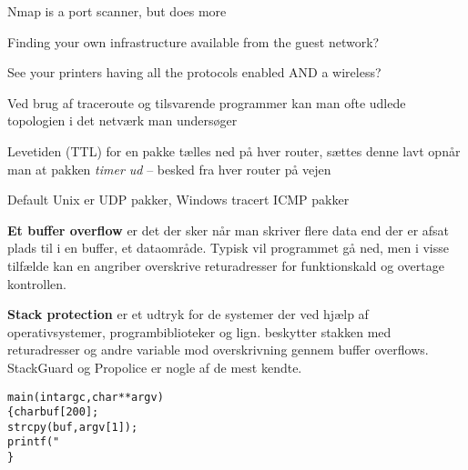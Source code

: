 \documentclass[Screen16to9,17pt]{foils}
\begin{document}


\begin{list2}
\item Nmap is a port scanner, but does more
\item Finding your own infrastructure available from the guest network?
\item See your printers having all the protocols enabled AND a wireless?
\end{list2}



\begin{list1}
\item Ved brug af traceroute og tilsvarende programmer kan man ofte
  udlede topologien i det netværk man undersøger
\item Levetiden (TTL) for en pakke tælles ned på hver router, sættes denne lavt
  opnår man at pakken \emph{timer ud} -- besked fra hver router på vejen
\item Default Unix er UDP pakker, Windows tracert ICMP pakker
\end{list1}



\begin{list1}
\item {\bfseries Et buffer overflow}
er det der sker når man skriver flere data end der er afsat plads til
i en buffer, et dataområde. Typisk vil programmet gå ned, men i visse
tilfælde kan en angriber overskrive returadresser for funktionskald og
overtage kontrollen.
\item {\bfseries Stack protection}
er et udtryk for de systemer der ved hjælp af operativsystemer,
programbiblioteker og lign. beskytter stakken med returadresser og
andre variable mod overskrivning gennem buffer overflows. StackGuard
og Propolice er nogle af de mest kendte.
\end{list1}



\begin{alltt}\small
main(int argc, char **argv)
\{      char buf[200];
        strcpy(buf, argv[1]);
        printf("%s\textbackslash{}n",buf);
\}
\end{alltt}
\end{document}
